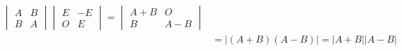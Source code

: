 \begin{exercise}
\begin{exgroup}
\begin{answer}
\begin{align*}
                \begin{vmatrix}
                    A & B \\
                    B & A
                \end{vmatrix}
                \begin{vmatrix}
                    E & -E \\
                    O & E
                \end{vmatrix}
                = \begin{vmatrix}
                        A+B & O   \\
                        B   & A-B
                    \end{vmatrix}    \\
                & =
                \lvert (A+B)(A-B) \rvert = \lvert A+B \rvert \lvert A-B \rvert
            \end{align*}
        \end{answer}


\end{exgroup}
\end{exercise}
